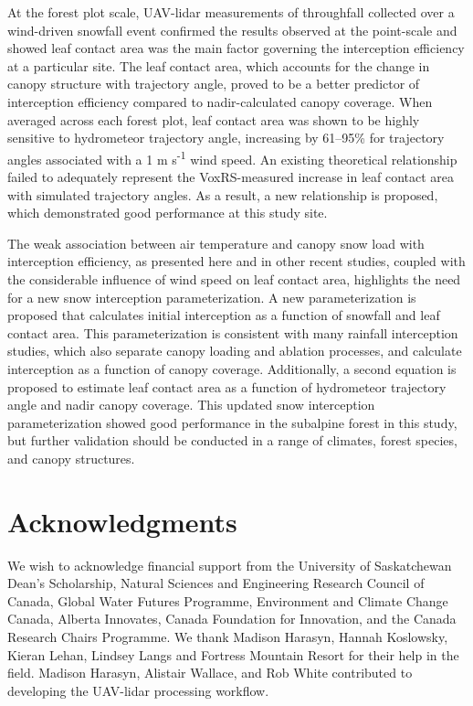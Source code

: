 \documentclass[
  letterpaper,
  DIV=11,
  numbers=noendperiod]{scrartcl}
\begin{document}
At the forest plot scale, UAV-lidar measurements of throughfall
collected over a wind-driven snowfall event confirmed the results
observed at the point-scale and showed leaf contact area was the main
factor governing the interception efficiency at a particular site. The
leaf contact area, which accounts for the change in canopy structure
with trajectory angle, proved to be a better predictor of interception
efficiency compared to nadir-calculated canopy coverage. When averaged
across each forest plot, leaf contact area was shown to be highly
sensitive to hydrometeor trajectory angle, increasing by 61--95\% for
trajectory angles associated with a 1 m s\textsuperscript{-1} wind
speed. An existing theoretical relationship failed to adequately
represent the VoxRS-measured increase in leaf contact area with
simulated trajectory angles. As a result, a new relationship is
proposed, which demonstrated good performance at this study site.

The weak association between air temperature and canopy snow load with
interception efficiency, as presented here and in other recent studies,
coupled with the considerable influence of wind speed on leaf contact
area, highlights the need for a new snow interception parameterization.
A new parameterization is proposed that calculates initial interception
as a function of snowfall and leaf contact area. This parameterization
is consistent with many rainfall interception studies, which also
separate canopy loading and ablation processes, and calculate
interception as a function of canopy coverage. Additionally, a second
equation is proposed to estimate leaf contact area as a function of
hydrometeor trajectory angle and nadir canopy coverage. This updated
snow interception parameterization showed good performance in the
subalpine forest in this study, but further validation should be
conducted in a range of climates, forest species, and canopy structures.

\section{Acknowledgments}\label{acknowledgments}

We wish to acknowledge financial support from the University of
Saskatchewan Dean's Scholarship, Natural Sciences and Engineering
Research Council of Canada, Global Water Futures Programme, Environment
and Climate Change Canada, Alberta Innovates, Canada Foundation for
Innovation, and the Canada Research Chairs Programme. We thank Madison
Harasyn, Hannah Koslowsky, Kieran Lehan, Lindsey Langs and Fortress
Mountain Resort for their help in the field. Madison Harasyn, Alistair
Wallace, and Rob White contributed to developing the UAV-lidar
processing workflow.
\end{document}
